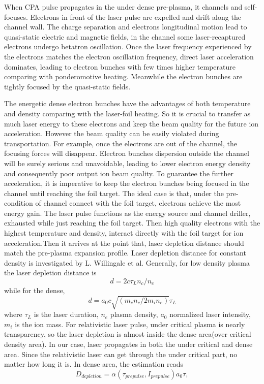 \documentclass[aip,twocolumn,superscriptaddress,showpacs,amsmath]{revtex4}
\begin{document}

When CPA pulse propagates in the under dense pre-plasma, it
channels\cite{Chanel} and self-focuses. Electrons in front of the laser pulse
are expelled and drift along the channel wall. The charge separation and
electrons longitudinal motion lead to quasi-static electric and magnetic
fields, in the channel some laser-recaptured electrons undergo betatron
oscillation. Once the laser frequency experienced by the electrons matches the
electron oscillation frequency, direct laser acceleration dominates, leading
to electron bunches with few times higher temperature comparing with
ponderomotive heating\cite{Pukhov,Liu}. Meanwhile the electron bunches are
tightly focused by the quasi-static fields.




The energetic dense electron bunches have the advantages of both temperature and density
comparing with the laser-foil heating. So it is crucial to transfer as much
laser energy to these electrons and keep the beam quality for the future ion acceleration.
However the beam quality can
be easily violated during transportation. For example, once the electrons are out of
the channel, the focusing forces will disappear. Electron bunches
dispersion outside the channel will be surely serious and unavoidable, leading
to lower electron energy density and consequently poor output ion beam
quality. To guarantee the further acceleration, it is imperative to keep the
electron bunches being focused in the channel until reaching the foil target.
The ideal case is that, under the pre-condition of channel connect with the
foil target, electrons achieve the most energy gain. The laser pulse functions
as the energy source and channel driller, exhausted while just reaching the
foil target. Then high quality electrons with the highest temperature and
density, interact directly with the foil target for ion acceleration.Then 
it arrives at the point that, laser depletion distance should match the
pre-plasma expansion profile. Laser depletion distance for constant density is
investigated by L. Willingale et al\cite{wil}. Generally, for low density
plasma the laser depletion distance is
\begin{equation*} d=2c{\tau}_Ln_c /n_e \end{equation*}
while for the dense,
\begin{equation*} d=a_0 c \sqrt{({m_e n_c}/{2 m_i n_e})} {\tau}_L \end{equation*}
where ${\tau}_L$ is the laser duration, $n_e$ plasma density, $a_0$ normalized
laser intensity, $m_i$ is the ion mass. For relativistic laser pulse, under
critical plasma is nearly transparency, so the laser depletion is almost  inside the dense
area(over critical density area). In our case, laser propagates in both the
under critical and dense area. Since the relativistic laser can get through
the under critical part, no matter how long it is. In dense area, the
estimation reads
\begin{equation*} D_{depletion} = \alpha ({\tau}_{prepulse}, I_{prepulse}) a_0{\tau} ,\end{equation*}
\end{document}
